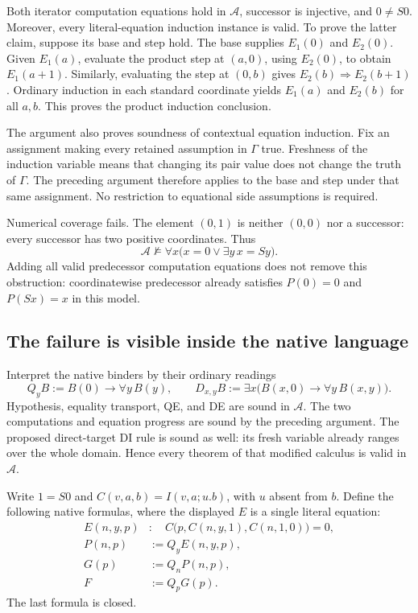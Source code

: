 Both iterator computation equations hold in $\mathcal A$, successor is
injective, and $0\ne S0$.  Moreover, every literal-equation induction
instance is valid.  To prove the latter claim, suppose its base and step
hold.  The base supplies $E_1(0)$ and $E_2(0)$.  Given $E_1(a)$, evaluate
the product step at $(a,0)$, using $E_2(0)$, to obtain $E_1(a+1)$.
Similarly, evaluating the step at $(0,b)$ gives
$E_2(b)\Rightarrow E_2(b+1)$.  Ordinary induction in each standard
coordinate yields $E_1(a)$ and $E_2(b)$ for all $a,b$.  This proves the
product induction conclusion.

The argument also proves soundness of contextual equation induction.
Fix an assignment making every retained assumption in $\Gamma$ true.
Freshness of the induction variable means that changing its pair value
does not change the truth of $\Gamma$.  The preceding argument therefore
applies to the base and step under that same assignment.  No restriction to
equational side assumptions is required.

Numerical coverage fails.  The element $(0,1)$ is neither $(0,0)$ nor a
successor: every successor has two positive coordinates.  Thus
\begin{equation}
 \mathcal A\not\models
 \forall x\bigl(x=0\lor\exists y\,x=Sy\bigr).
 \label{eq:product-no-coverage}
\end{equation}
Adding all valid predecessor computation equations does not remove this
obstruction: coordinatewise predecessor already satisfies
$P(0)=0$ and $P(Sx)=x$ in this model.

\subsection{The failure is visible inside the native language}

Interpret the native binders by their ordinary readings
\[
 Q_yB:=B(0)\to\forall y\,B(y),\qquad
 D_{x,y}B:=\exists x\bigl(B(x,0)\to\forall y\,B(x,y)\bigr).
\]
Hypothesis, equality transport, QE, and DE are sound in $\mathcal A$.
The two computations and equation progress are sound by the preceding
argument.  The proposed direct-target DI rule is sound as well: its fresh
variable already ranges over the whole domain.  Hence every theorem of
that modified calculus is valid in $\mathcal A$.

Write $1=S0$ and $C(v,a,b)=I(v,a;u.b)$, with $u$ absent from $b$.
Define the following native formulas, where the displayed $E$ is a single
literal equation:
\begin{align*}
 E(n,y,p)&:\quad
 C\bigl(p,C(n,y,1),C(n,1,0)\bigr)=0,\\
 P(n,p)&:=Q_yE(n,y,p),\\
 G(p)&:=Q_nP(n,p),\\
 F&:=Q_pG(p).
\end{align*}
The last formula is closed.

